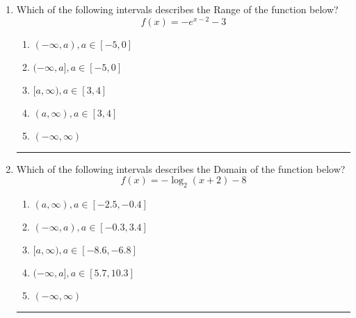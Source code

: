 \documentclass[14pt]{extbook}
\newcommand{\litem}[1]{\item#1\hspace*{-1cm}\rule{\textwidth}{0.4pt}}
\begin{document}
\begin{enumerate}
{\begin{enumerate}[label=\Alph*.]
\end{enumerate} }
\litem{
Which of the following intervals describes the Range of the function below?\[ f(x) = -e^{x-2}-3 \]\begin{enumerate}[label=\Alph*.]
\item \( (-\infty, a), a \in [-5, 0] \)
\item \( (-\infty, a], a \in [-5, 0] \)
\item \( [a, \infty), a \in [3, 4] \)
\item \( (a, \infty), a \in [3, 4] \)
\item \( (-\infty, \infty) \)

\end{enumerate} }
\litem{
Which of the following intervals describes the Domain of the function below?\[ f(x) = -\log_2{(x+2)}-8 \]\begin{enumerate}[label=\Alph*.]
\item \( (a, \infty), a \in [-2.5, -0.4] \)
\item \( (-\infty, a), a \in [-0.3, 3.4] \)
\item \( [a, \infty), a \in [-8.6, -6.8] \)
\item \( (-\infty, a], a \in [5.7, 10.3] \)
\item \( (-\infty, \infty) \)

\end{enumerate} }
\end{enumerate}
\end{document}
